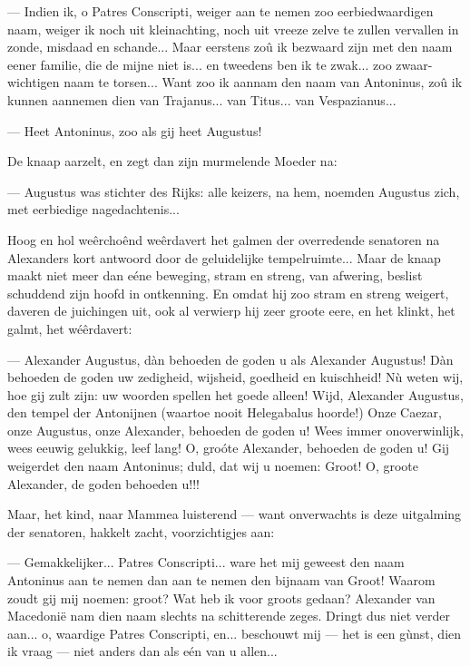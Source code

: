 \documentclass[a4paper, 12pt, oneside, dutch]{article}
\begin{document}
--- Indien ik, o Patres Conscripti, weiger aan te nemen zoo eerbiedwaardigen naam, weiger ik noch uit kleinachting, noch uit vreeze zelve te zullen vervallen in zonde, misdaad en schande... Maar eerstens zoû ik bezwaard zijn met den naam eener familie, die de mijne niet is... en tweedens ben ik te zwak... zoo zwaar-wichtigen naam te torsen... Want zoo ik aannam den naam van Antoninus, zoû ik kunnen aannemen dien van Trajanus... van Titus... van Vespazianus...

--- Heet Antoninus, zoo als gij heet Augustus!

De knaap aarzelt, en zegt dan zijn murmelende Moeder na:

--- Augustus was stichter des Rijks: alle keizers, na hem, noemden Augustus zich, met eerbiedige nagedachtenis...

Hoog en hol weêrchoênd weêrdavert het galmen der overredende senatoren na Alexanders kort antwoord door de geluidelijke tempelruimte... Maar de knaap maakt niet meer dan eéne beweging, stram en streng, van afwering, beslist schuddend zijn hoofd in ontkenning. En omdat hij zoo stram en streng weigert, daveren de juichingen uit, ook al verwierp hij zeer groote eere, en het klinkt, het galmt, het wéêrdavert:

--- Alexander Augustus, dàn behoeden de goden u als Alexander Augustus! Dàn behoeden de goden uw zedigheid, wijsheid, goedheid en kuischheid! Nù weten wij, hoe gij zult zijn: uw woorden spellen het goede alleen! Wijd, Alexander Augustus, den tempel der Antonijnen (waartoe nooit Helegabalus hoorde!) Onze Caezar, onze Augustus, onze Alexander, behoeden de goden u! Wees immer onoverwinlijk, wees eeuwig gelukkig, leef lang! O, groóte Alexander, behoeden de goden u! Gij weigerdet den naam Antoninus; duld, dat wij u noemen: Groot! O, groote Alexander, de goden behoeden u!!!

Maar, het kind, naar Mammea luisterend --- want onverwachts is deze uitgalming der senatoren, hakkelt zacht, voorzichtigjes aan:

--- Gemakkelijker... Patres Conscripti... ware het mij geweest den naam Antoninus aan te nemen dan aan te nemen den bijnaam van Groot! Waarom zoudt gij mij noemen: groot? Wat heb ik voor groots gedaan? Alexander van Macedonië nam dien naam slechts na schitterende zeges. Dringt dus niet verder aan... o, waardige Patres Conscripti, en... beschouwt mij --- het is een gùnst, dien ik vraag --- niet anders dan als eén van u allen...
\end{document}
